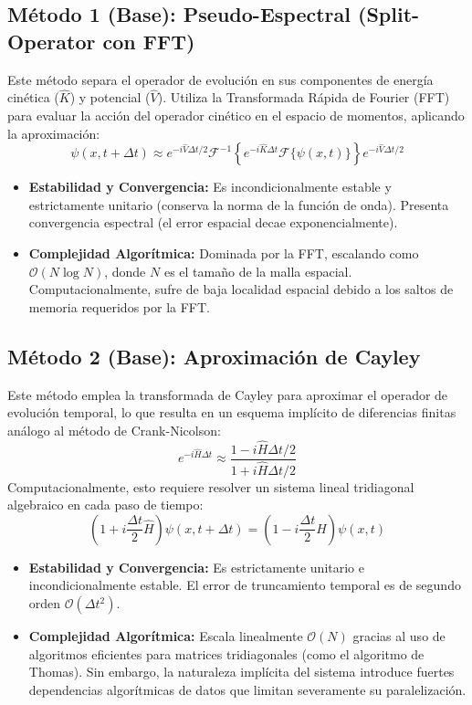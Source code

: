 \documentclass[12pt, a4paper]{article}
\begin{document}
\subsection{Método 1 (Base): Pseudo-Espectral (Split-Operator con FFT)}
Este método separa el operador de evolución en sus componentes de energía cinética ($\hat{K}$) y potencial ($\hat{V}$). Utiliza la Transformada Rápida de Fourier (FFT) para evaluar la acción del operador cinético en el espacio de momentos, aplicando la aproximación:
$$ \psi(x, t+\Delta t) \approx e^{-i \hat{V} \Delta t / 2} \mathcal{F}^{-1} \left\{ e^{-i \hat{K} \Delta t} \mathcal{F} \{ \psi(x,t) \} \right\} e^{-i \hat{V} \Delta t / 2} $$
\begin{itemize}
    \item \textbf{Estabilidad y Convergencia:} Es incondicionalmente estable y estrictamente unitario (conserva la norma de la función de onda). Presenta convergencia espectral (el error espacial decae exponencialmente).
    \item \textbf{Complejidad Algorítmica:} Dominada por la FFT, escalando como $\mathcal{O}(N \log N)$, donde $N$ es el tamaño de la malla espacial. Computacionalmente, sufre de baja localidad espacial debido a los saltos de memoria requeridos por la FFT.
\end{itemize}

\subsection{Método 2 (Base): Aproximación de Cayley}
Este método emplea la transformada de Cayley para aproximar el operador de evolución temporal, lo que resulta en un esquema implícito de diferencias finitas análogo al método de Crank-Nicolson:
$$ e^{-i\hat{H}\Delta t} \approx \frac{1 - i\hat{H}\Delta t / 2}{1 + i\hat{H}\Delta t / 2} $$
Computacionalmente, esto requiere resolver un sistema lineal tridiagonal algebraico en cada paso de tiempo:
$$ \left(1 + i \frac{\Delta t}{2} \hat{H}\right) \psi(x, t+\Delta t) = \left(1 - i \frac{\Delta t}{2} \hat{H}\right) \psi(x,t) $$
\begin{itemize}
    \item \textbf{Estabilidad y Convergencia:} Es estrictamente unitario e incondicionalmente estable. El error de truncamiento temporal es de segundo orden $\mathcal{O}(\Delta t^2)$.
    \item \textbf{Complejidad Algorítmica:} Escala linealmente $\mathcal{O}(N)$ gracias al uso de algoritmos eficientes para matrices tridiagonales (como el algoritmo de Thomas). Sin embargo, la naturaleza implícita del sistema introduce fuertes dependencias algorítmicas de datos que limitan severamente su paralelización.
\end{itemize}
\end{document}
